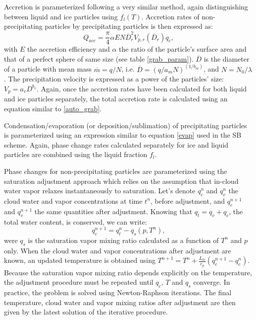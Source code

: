 \documentclass[12pt,A4,french]{article}
\begin{document}
\begin{description}
Accretion is parameterized following a very similar method, again distinguishing between liquid and ice particles using $f_l\left(T\right)$. Accretion rates of non-precipitating particles by precipitating particles is then expressed as:
\begin{equation}
    Q_{acc} = \frac{\pi}{4}\alpha E N \overline{D}_r^2 V_{p,r}\left(\overline{D}_r\right) q_c,
    \label{auto_lin}
\end{equation}
with $E$ the accretion efficiency and $\alpha$ the ratio of the particle's surface area and that of a perfect sphere of same size (see table \ref{grab_param}). $\overline{D}$ is the diameter of a particle with mean mass $\overline{m} = q/N$, i.e. $\overline{D} = \left(q/a_m N\right)^{\left(1/b_m\right)}$, and $N=N_0 / \lambda$. The precipitation velocity is expressed as a power of the particles' size: $V_p = a_v D^{b_v}$. Again, once the accretion rates have been calculated for both liquid and ice particles separately, the total accretion rate is calculated using an equation similar to \ref{auto_grab}.

Condensation/evaporation (or deposition/sublimation) of precipitating particles is parameterized using an expression similar to equation \ref{evap} used in the SB scheme. Again, phase change rates calculated separately for ice and liquid particles are combined using the liquid fraction $f_l$. 

Phase changes for non-precipitating particles are parameterized using the saturation adjustment approach which relies on the assumption that in-cloud water vapor relaxes instantaneously to saturation. Let's denote $q_{c}^{n}$ and $q_{v}^{n}$ the cloud water and vapor concentrations at time $t^{n}$, before adjustment, and $q_{c}^{n+1}$ and $q_{v}^{n+1}$ the same quantities after adjustment. 
Knowing that $q_{t} = q_{v} + q_{c}$, the total  water content, is conserved, we can write:
\begin{equation}
q_{c}^{n+1} = q_{t}^{n} - q_{s}\left(p,T^{n}\right),
\label{satadj1}
\end{equation}
were $q_{s}$ is the saturation vapor mixing ratio calculated as a function of $T^{n}$ and $p$ only. When the cloud water and vapor concentrations after adjustment are known, an updated temperature is obtained using $T^{n+1} = T^n + \frac{L_{lv}}{c_{p}}\left(q_c^{n+1} - q_c^n\right)$. Because the saturation vapor mixing ratio depends explicitly on the temperature, the adjustment procedure must be repeated until $q_c$, $T$ and $q_s$ converge. In practice, the problem is solved using Newton-Raphson iterations. The final temperature, cloud water and vapor mixing ratios after adjustment are then given by the latest solution of the iterative procedure.


\end{description}
\end{document}
